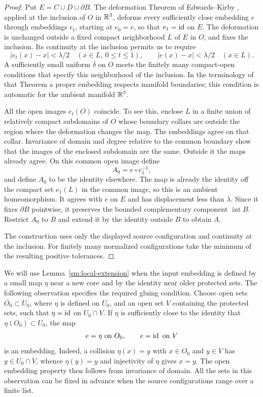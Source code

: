 \begin{proof}
Put $E=C\cup D\cup\partial B$.  The deformation Theorem of
Edwards--Kirby \cite[Theorem~5.1]{EdwardsKirby1971}, applied at the
inclusion of $O$ in $\mathbb R^3$, deforms every sufficiently close embedding
$e$ through embeddings $e_t$, starting at $e_0=e$, so that
$e_1=\operatorname{id}$ on $E$.  The deformation is unchanged outside a fixed
compact neighborhood $L$ of $E$ in $O$, and fixes the inclusion.
Its continuity at the inclusion permits us to require
\[
 |e_t(x)-x|<\lambda/2\quad(x\in L,\ 0\le t\le1),
 \qquad |e(x)-x|<\lambda/2\quad(x\in L).
\]
A sufficiently small uniform $\delta$ on $O$ meets the finitely many
compact-open conditions that specify this neighborhood of the
inclusion.  In the terminology of that Theorem a proper embedding
respects manifold boundaries; this condition is automatic for the
ambient manifold $\mathbb R^3$.

All the open images $e_t(O)$ coincide.  To see this, enclose $L$ in a
finite union of relatively compact subdomains of $O$ whose boundary collars are outside
the region where the deformation changes the map.  The embeddings
agree on that collar. Invariance of domain
\cite[Theorem~2B.3]{Hatcher2002} and degree relative to
the common boundary show that the images of the enclosed subdomain
are the same.  Outside it the maps already agree.
On this common open image define
\[
 A_0=e\circ e_1^{-1},
\]
and define $A_0$ to be the identity elsewhere.  The map is already
the identity off the compact set $e_1(L)$ in the common image, so
this is an ambient homeomorphism.  It agrees with $e$ on $E$ and has
displacement less than $\lambda$.  Since it fixes $\partial B$
pointwise, it preserves the bounded complementary component
$\operatorname{int}B$.  Restrict $A_0$ to $B$ and extend it by the
identity outside $B$ to obtain $A$.

The construction uses only the displayed source configuration and
continuity at the inclusion.  For finitely many normalized
configurations take the minimum of the resulting positive tolerances.
\end{proof}

We will use Lemma~\ref{sm:local-extension} when the input embedding is
defined by a small map $\eta$ near a new core and by the identity near
older protected sets.  The following observation specifies the required
gluing condition.  Choose open sets
$\overline{O_0}\subset U_0$, where $\eta$ is defined on $U_0$, and
an open set $V$ containing the protected sets, such that
$\eta=\operatorname{id}$ on $U_0\cap V$.  If $\eta$ is sufficiently close to
the identity that $\eta(O_0)\subset U_0$, the map
\begin{equation}
 \label{sm:patched-embedding}
 e=\eta\ \hbox{on }O_0,\qquad e=\operatorname{id}\ \hbox{on }V
\end{equation}
is an embedding.  Indeed, a collision $\eta(x)=y$ with
$x\in O_0$ and $y\in V$ has $y\in U_0\cap V$, whence
$\eta(y)=y$ and injectivity of $\eta$ gives $x=y$.  The open
embedding property then follows from invariance of domain.  All the
sets in this observation can be fixed in advance when the source
configurations range over a finite list.

